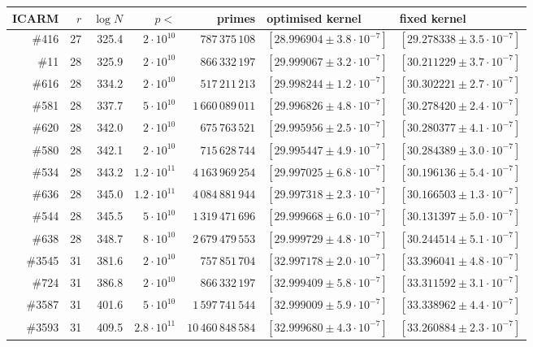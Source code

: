 \documentclass[11pt]{amsart}
\theoremstyle{remark}
\theoremstyle{definition}
\begin{document}
\begin{table}[!ht]
\centering\footnotesize
\setlength{\tabcolsep}{4pt}
\begin{tabular}{rrrrrll}
\toprule
ICARM & $r$ & $\log N$ & $p<$ & primes & optimised kernel & fixed kernel\\
\midrule
\#416 & 27 & 325.4 & $2\cdot10^{10}$ & $787\,375\,108$ & $[28.996904\pm3.8\cdot10^{-7}]$ & $[29.278338\pm3.5\cdot10^{-7}]$\\
\#11 & 28 & 325.9 & $2\cdot10^{10}$ & $866\,332\,197$ & $[29.999067\pm3.2\cdot10^{-7}]$ & $[30.211229\pm3.7\cdot10^{-7}]$\\
\#616 & 28 & 334.2 & $2\cdot10^{10}$ & $517\,211\,213$ & $[29.998244\pm1.2\cdot10^{-7}]$ & $[30.302221\pm2.7\cdot10^{-7}]$\\
\#581 & 28 & 337.7 & $5\cdot10^{10}$ & $1\,660\,089\,011$ & $[29.996826\pm4.8\cdot10^{-7}]$ & $[30.278420\pm2.4\cdot10^{-7}]$\\
\#620 & 28 & 342.0 & $2\cdot10^{10}$ & $675\,763\,521$ & $[29.995956\pm2.5\cdot10^{-7}]$ & $[30.280377\pm4.1\cdot10^{-7}]$\\
\#580 & 28 & 342.1 & $2\cdot10^{10}$ & $715\,628\,744$ & $[29.995447\pm4.9\cdot10^{-7}]$ & $[30.284389\pm3.0\cdot10^{-7}]$\\
\#534 & 28 & 343.2 & $1.2\cdot10^{11}$ & $4\,163\,969\,254$ & $[29.997025\pm6.8\cdot10^{-7}]$ & $[30.196136\pm5.4\cdot10^{-7}]$\\
\#636 & 28 & 345.0 & $1.2\cdot10^{11}$ & $4\,084\,881\,944$ & $[29.997318\pm2.3\cdot10^{-7}]$ & $[30.166503\pm1.3\cdot10^{-7}]$\\
\#544 & 28 & 345.5 & $5\cdot10^{10}$ & $1\,319\,471\,696$ & $[29.999668\pm6.0\cdot10^{-7}]$ & $[30.131397\pm5.0\cdot10^{-7}]$\\
\#638 & 28 & 348.7 & $8\cdot10^{10}$ & $2\,679\,479\,553$ & $[29.999729\pm4.8\cdot10^{-7}]$ & $[30.244514\pm5.1\cdot10^{-7}]$\\
\#3545 & 31 & 381.6 & $2\cdot10^{10}$ & $757\,851\,704$ & $[32.997178\pm2.0\cdot10^{-7}]$ & $[33.396041\pm4.8\cdot10^{-7}]$\\
\#724 & 31 & 386.8 & $2\cdot10^{10}$ & $866\,332\,197$ & $[32.999409\pm5.8\cdot10^{-7}]$ & $[33.311592\pm3.1\cdot10^{-7}]$\\
\#3587 & 31 & 401.6 & $5\cdot10^{10}$ & $1\,597\,741\,544$ & $[32.999009\pm5.9\cdot10^{-7}]$ & $[33.338962\pm4.4\cdot10^{-7}]$\\
\#3593 & 31 & 409.5 & $2.8\cdot10^{11}$ & $10\,460\,848\,584$ & $[32.999680\pm4.3\cdot10^{-7}]$ & $[33.260884\pm2.3\cdot10^{-7}]$\\

\end{tabular}
\end{table}
\end{document}
